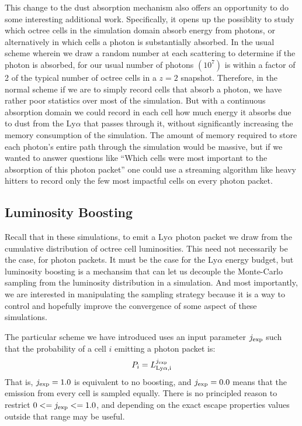 This change to the dust absorption mechanism also offers an opportunity to do some interesting additional work.
Specifically, it opens up the possiblity to study which octree cells in the simulation domain absorb energy from photons, or alternatively in which cells a photon is substantially absorbed.
In the usual scheme wherein we draw a random number at each scattering to determine if the photon is absorbed, for our usual number of photons $(10^{7})$ is within a factor of 2 of the typical number of octree cells in a $z=2$ snapshot.
Therefore, in the normal scheme if we are to simply record cells that absorb a photon, we have rather poor statistics over most of the simulation.
But with a continuous absorption domain we could record in each cell how much energy it absorbs due to dust from the Ly$\alpha$ that passes through it, without significantly increasing the memory consumption of the simulation.
The amount of memory required to store each photon's entire path through the simulation would be massive, but if we wanted to answer questions like ``Which cells were most important to the absorption of this photon packet'' one could use a streaming algorithm like heavy hitters to record only the few most impactful cells on every photon packet.

\subsection{Luminosity Boosting}
Recall that in these simulations, to emit a Ly$\alpha$ photon packet we draw from the cumulative distribution of octree cell luminosities.
This need not necessarily be the case, for photon packets.
It must be the case for the Ly$\alpha$ energy budget, but luminosity boosting is a mechansim that can let us decouple the Monte-Carlo sampling from the luminosity distribution in a simulation.
And most importantly, we are interested in manipulating the sampling strategy because it is a way to control and hopefully improve the convergence of some aspect of these simulations.

The particular scheme we have introduced uses an input parameter $j_{\rm exp}$ such that the probability of a cell $i$ emitting a photon packet is:
\begin{equation}
    P_{i} = L_{\rm Ly \alpha, i} ^{j_{\rm exp}}
\end{equation}
That is, $j_{\rm exp} = 1.0$ is equivalent to no boosting, and $j_{\rm exp} = 0.0$ means that the emission from every cell is sampled equally.
There is no principled reason to restrict $0 <= j_{\rm exp} <= 1.0$, and depending on the exact escape properties values outside that range may be useful.

